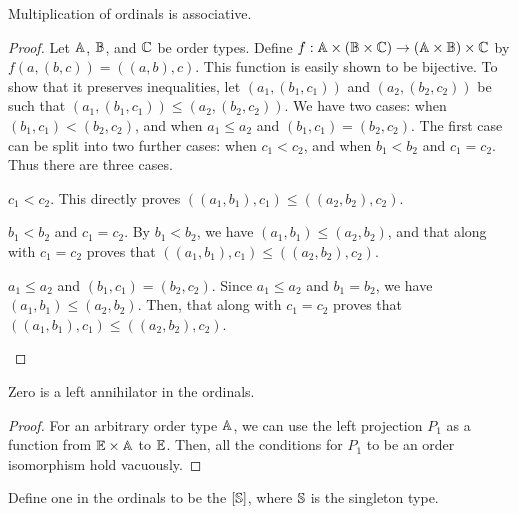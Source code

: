 \documentclass[../../math.tex]{subfiles}
\begin{document}
\begin{instance}
    Multiplication of ordinals is associative.
\end{instance}
\begin{proof}
    Let $\A$, $\B$, and $\C$ be order types.  Define $f : \A \times (\B \times
    \C) \to (\A \times \B) \times \C$ by $f(a, (b, c)) = ((a, b), c)$.  This
    function is easily shown to be bijective.  To show that it preserves
    inequalities, let $(a_1, (b_1, c_1))$ and $(a_2, (b_2, c_2))$ be such that
    $(a_1, (b_1, c_1)) \leq (a_2, (b_2, c_2))$.  We have two cases: when $(b_1,
    c_1) < (b_2, c_2)$, and when $a_1 \leq a_2$ and $(b_1, c_1) = (b_2, c_2)$.
    The first case can be split into two further cases: when $c_1 < c_2$, and
    when $b_1 < b_2$ and $c_1 = c_2$.  Thus there are three cases.
    \setcounter{case}{0}
    \begin{case} $c_1 < c_2$.
        This directly proves $((a_1, b_1), c_1) \leq ((a_2, b_2), c_2)$.
    \end{case}
    \begin{case} $b_1 < b_2$ and $c_1 = c_2$.
        By $b_1 < b_2$, we have $(a_1, b_1) \leq (a_2, b_2)$, and that along
        with $c_1 = c_2$ proves that $((a_1, b_1), c_1) \leq ((a_2, b_2), c_2)$.
    \end{case}
    \begin{case} $a_1 \leq a_2$ and $(b_1, c_1) = (b_2, c_2)$.
        Since $a_1 \leq a_2$ and $b_1 = b_2$, we have $(a_1, b_1) \leq (a_2,
        b_2)$.  Then, that along with $c_1 = c_2$ proves that $((a_1, b_1), c_1)
        \leq ((a_2, b_2), c_2)$.
    \end{case}
\end{proof}

\begin{instance}
    Zero is a left annihilator in the ordinals.
\end{instance}
\begin{proof}
    For an arbitrary order type $\A$, we can use the left projection $P_1$ as a
    function from $\E \times \A$ to $\E$.  Then, all the conditions for $P_1$ to
    be an order isomorphism hold vacuously.
\end{proof}

\begin{instance}
    Define one in the ordinals to be the $[\S]$, where $\S$ is the singleton
    type.
\end{instance}
\end{document}
